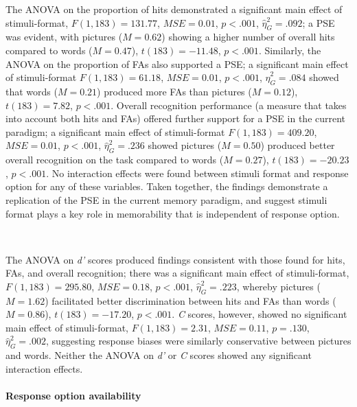 \documentclass[
  11pt,
]{article}
\begin{document}
The ANOVA on the proportion of hits demonstrated a significant main
effect of stimuli-format, \(F(1, 183) = 131.77\),
\(\mathit{MSE} = 0.01\), \(p < .001\), \(\hat{\eta}^2_G = .092\); a PSE
was evident, with pictures (\(M = 0.62\)) showing a higher number of
overall hits compared to words (\(M = 0.47\)), \(t(183) = -11.48\),
\(p < .001\). Similarly, the ANOVA on the proportion of FAs also
supported a PSE; a significant main effect of stimuli-format
\(F(1, 183) = 61.18\), \(\mathit{MSE} = 0.01\), \(p < .001\),
\(\hat{\eta}^2_G = .084\) showed that words (\(M = 0.21\)) produced more
FAs than pictures (\(M = 0.12\)), \(t(183) = 7.82\), \(p < .001\).
Overall recognition performance (a measure that takes into account both
hits and FAs) offered further support for a PSE in the current paradigm;
a significant main effect of stimuli-format \(F(1, 183) = 409.20\),
\(\mathit{MSE} = 0.01\), \(p < .001\), \(\hat{\eta}^2_G = .236\) showed
pictures (\(M = 0.50\)) produced better overall recognition on the task
compared to words (\(M = 0.27\)), \(t(183) = -20.23\), \(p < .001\). No
interaction effects were found between stimuli format and response
option for any of these variables. Taken together, the findings
demonstrate a replication of the PSE in the current memory paradigm, and
suggest stimuli format plays a key role in memorability that is
independent of response option.

~ ~

The ANOVA on \emph{d'} scores produced findings consistent with those
found for hits, FAs, and overall recognition; there was a significant
main effect of stimuli-format, \(F(1, 183) = 295.80\),
\(\mathit{MSE} = 0.18\), \(p < .001\), \(\hat{\eta}^2_G = .223\),
whereby pictures (\(M = 1.62\)) facilitated better discrimination
between hits and FAs than words (\(M = 0.86\)), \(t(183) = -17.20\),
\(p < .001\). \emph{C} scores, however, showed no significant main
effect of stimuli-format, \(F(1, 183) = 2.31\), \(\mathit{MSE} = 0.11\),
\(p = .130\), \(\hat{\eta}^2_G = .002\), suggesting response biases were
similarly conservative between pictures and words. Neither the ANOVA on
\emph{d'} or \emph{C} scores showed any significant interaction effects.

\hypertarget{response-option-availability}{%
\paragraph{Response option
availability}\label{response-option-availability}}
\end{document}
